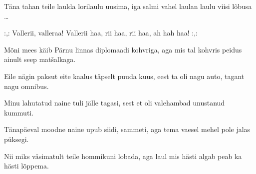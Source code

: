 T\"ana tahan teile laulda
lorilaulu uusima,
iga salmi vahel laulan
laulu viisi l\~obusa \ldots

 :,: Vallerii, valleraa!
 Vallerii haa, rii haa, rii haa, ah hah haa! :,: 

M\~oni mees k\"aib P\"arnu linnas
diplomaadi kohvriga,
aga mis tal kohvris peidus
ainult seep mat\v{s}alkaga.

Eile n\"agin paksut eite
kaalus t\"apselt puuda kuus,
eest ta oli nagu auto,
tagant nagu omnibus.

Minu lahutatud naine
tuli j\"alle tagasi,
sest et oli valehambad
unustanud kummuti.

T\"anap\"aeval moodne naine
upub siidi, sammeti,
aga tema vaesel mehel
pole jalas p\"uksegi.

Nii miks v\"asimatult teile
hommikuni lobada,
aga laul mis h\"asti algab
peab ka h\"asti l\~oppema.
